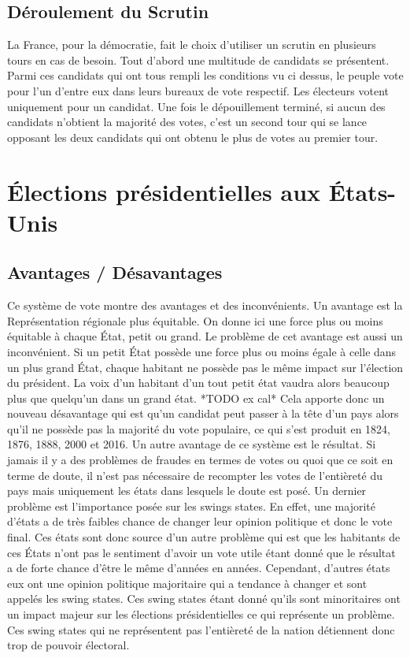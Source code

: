 \documentclass[12pt,a4paper]{report}
\begin{document}
\subsection{Déroulement du Scrutin}

La France, pour la démocratie, fait le choix d'utiliser un scrutin en plusieurs tours en cas de besoin. Tout d’abord une multitude de candidats se présentent. Parmi ces candidats qui ont tous rempli les conditions vu ci dessus, le peuple vote pour l’un d’entre eux dans leurs bureaux de vote respectif. Les électeurs votent uniquement pour un candidat. Une fois le dépouillement terminé, si aucun des candidats n’obtient la majorité des votes, c’est un second tour qui se lance opposant les deux candidats qui ont obtenu le plus de votes au premier tour.

\section{Élections présidentielles aux États-Unis}

\subsection{Avantages / Désavantages} %
Ce système de vote montre des avantages et des inconvénients.
Un avantage est la Représentation régionale plus équitable.
On donne ici une force plus ou moins équitable à chaque État, petit ou grand.
Le problème de cet avantage est aussi un inconvénient.
Si un petit État possède une force plus ou moins égale à celle dans un plus grand État, chaque habitant ne possède pas le même impact sur l'élection du président.
La voix d’un habitant d’un tout petit état vaudra alors beaucoup plus que quelqu’un dans un grand état. *TODO ex cal*
Cela apporte donc un nouveau désavantage qui est qu’un candidat peut passer à la tête d’un pays alors qu’il ne possède pas la majorité du vote populaire, ce qui s’est produit en 1824, 1876, 1888, 2000 et 2016.
Un autre avantage de ce système est le résultat.
Si jamais il y a des problèmes de fraudes en termes de votes ou quoi que ce soit en terme de doute, il n’est pas nécessaire de recompter les votes de l'entièreté du pays mais uniquement les états dans lesquels le doute est posé.
Un dernier problème est l’importance posée sur les swings states.
En effet, une majorité d’états a de très faibles chance de changer leur opinion politique et donc le vote final.
Ces états sont donc source d’un autre problème qui est que les habitants de ces États n’ont pas le sentiment d’avoir un vote utile étant donné que le résultat a de forte chance d’être le même d’années en années.
Cependant, d’autres états eux ont une opinion politique majoritaire qui a tendance à changer et sont appelés les swing states.
Ces swing states étant donné qu’ils sont minoritaires ont un impact majeur sur les élections présidentielles ce qui représente un problème.
Ces swing states qui ne représentent pas l'entièreté de la nation détiennent donc trop de pouvoir électoral.
\nocite{greelane:eleccoll}
\nocite{gov:fedpapers68}
\end{document}
